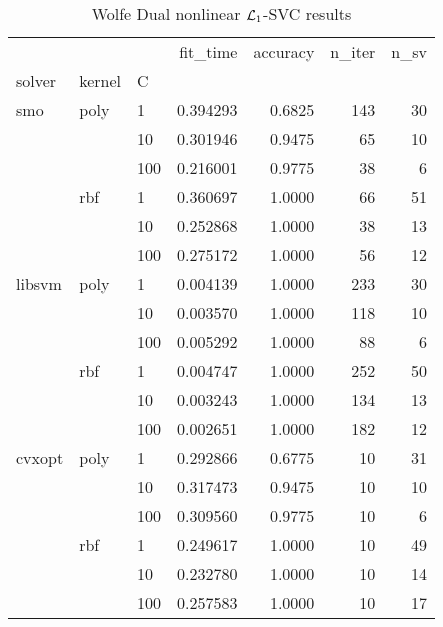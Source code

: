 \begin{table}[H]
\centering
\caption{Wolfe Dual nonlinear $\protect \mathcal{L}_1$-SVC results}
\label{nonlinear_dual_l1_svc_cv_results}
\begin{tabular}{lllrrrr}
\toprule
       &     &     &  fit\_time &  accuracy &  n\_iter &  n\_sv \\
solver & kernel & C &           &           &         &       \\
\midrule
smo & poly & 1   &  0.394293 &    0.6825 &     143 &    30 \\
       &     & 10  &  0.301946 &    0.9475 &      65 &    10 \\
       &     & 100 &  0.216001 &    0.9775 &      38 &     6 \\
       & rbf & 1   &  0.360697 &    1.0000 &      66 &    51 \\
       &     & 10  &  0.252868 &    1.0000 &      38 &    13 \\
       &     & 100 &  0.275172 &    1.0000 &      56 &    12 \\
libsvm & poly & 1   &  0.004139 &    1.0000 &     233 &    30 \\
       &     & 10  &  0.003570 &    1.0000 &     118 &    10 \\
       &     & 100 &  0.005292 &    1.0000 &      88 &     6 \\
       & rbf & 1   &  0.004747 &    1.0000 &     252 &    50 \\
       &     & 10  &  0.003243 &    1.0000 &     134 &    13 \\
       &     & 100 &  0.002651 &    1.0000 &     182 &    12 \\
cvxopt & poly & 1   &  0.292866 &    0.6775 &      10 &    31 \\
       &     & 10  &  0.317473 &    0.9475 &      10 &    10 \\
       &     & 100 &  0.309560 &    0.9775 &      10 &     6 \\
       & rbf & 1   &  0.249617 &    1.0000 &      10 &    49 \\
       &     & 10  &  0.232780 &    1.0000 &      10 &    14 \\
       &     & 100 &  0.257583 &    1.0000 &      10 &    17 \\
\bottomrule
\end{tabular}
\end{table}
